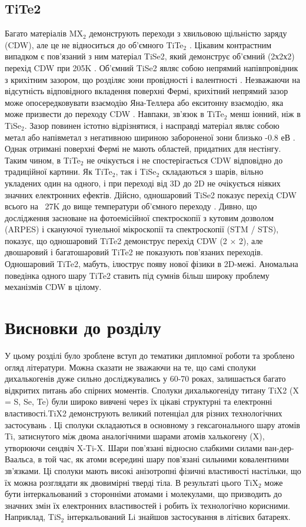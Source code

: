 \subsection{TiTe2}
Багато матеріалів MX$_2$ демонструють переходи з хвильовою щільністю заряду (CDW), але це не відноситься до об'ємного TiTe$_2$ \cite{PhysRevB29,TiTe2_2, TiTe2_3, TiTe2_4}. Цікавим контрастним випадком є пов'язаний з ним матеріал TiSe2, який демонструє об'ємний (2х2х2) перехід CDW при 205K \cite{TiTe2_5}. Об'ємний TiSe2 являє собою непрямий напівпровідник з крихітним зазором, що розділяє зони провідності і валентності \cite{TiTe2_6}. Незважаючи на відсутність відповідного вкладення поверхні Фермі, крихітний непрямий зазор може опосередковувати взаємодію Яна-Теллера або екситонну взаємодію, яка може призвести до переходу CDW \cite{TiTe2_6}. Навпаки, зв'язок в TiTe$_2$ менш іонний, ніж в TiSe$_2$. Зазор повинен істотно відрізнятися, і насправді матеріал являє собою метал або напівметал з негативною шириною забороненої зони близько -0.8 $еВ$ \cite{PhysRevB.54.2453}. Однак отримані поверхні Фермі не мають областей, придатних для нестінгу. Таким чином, в TiTe$_2$ не очікується і не спостерігається CDW відповідно до традиційної картини. Як TiTe$_2$, так і TiSe$_2$ складаються з шарів, вільно укладених один на одного, і при переході від 3D до 2D не очікується ніяких значних електронних ефектів. Дійсно, одношаровий TiSe2 показує перехід CDW всього на ~27K до вище температури об'ємного переходу \cite{TiTe2_7}.
Дивно, що дослідження засноване на фотоемісійної спектроскопії з кутовим дозволом (ARPES) і скануючої тунельної мікроскопії та спектроскопії (STM / STS), показує, що одношаровий TiTe2 демонструє перехід CDW (2 × 2), але двошаровий і багатошаровий TiTe2 не показують пов'язаних переходів. Одношаровий TiTe2, мабуть, ілюструє появу нової фізики в 2D-межі. Аномальна поведінка одного шару TiTe2 ставить під сумнів більш широку проблему механізмів CDW в цілому.
\section{Висновки до розділу} 
У цьому розділі було зроблене вступ до тематики дипломної роботи та зроблено огляд літератури. Можна сказати не зважаючи на те, що самі сполуки дихалькогенів дуже сильно досліджувались у 60-70 роках, залишається багато відкритих питань або спірних моментів. 
Сполуки дихалькогеніду титану TiX2 (X = S, Se, Te) були широко вивчені через їх цікаві структурні та електронні властивості.TiX2 демонструють великий потенціал для різних технологічних застосувань \cite{Yoffe}. Ці сполуки складаються в основному з гексагонального шару атомів Ti, затиснутого між двома аналогічними шарами атомів халькогену (X), утворюючи  сендвіч X-Ti-X. Шари пов'язані відносно слабкими силами ван-дер-Ваальса, в той час, як атоми всередині шару пов'язані сильними ковалентними зв'язками. Ці сполуки мають високі анізотропні фізичні властивості настільки, що їх можна розглядати як двовимірні тверді тіла. В результаті цього TiX$_2$ може бути інтеркальований з сторонніми атомами і молекулами, що призводить до значних змін їх електронних властивостей і робить їх технологічно корисними. Наприклад, TiS$_2$ інтеркальований Li знайшов застосування в літієвих батареях.

